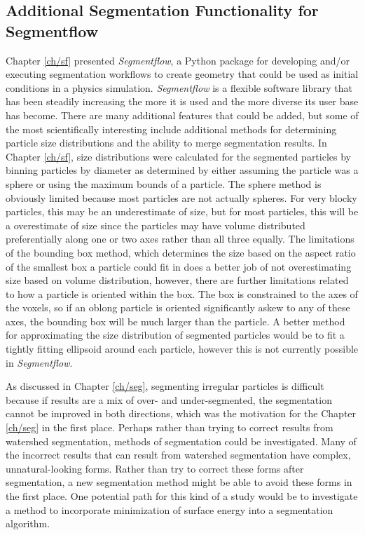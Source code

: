 \subsection{Additional Segmentation Functionality for Segmentflow}
Chapter \ref{ch/sf} presented \textit{Segmentflow}, a Python package for
developing and/or executing segmentation workflows to create geometry
that could be used as initial conditions in a physics simulation.
\textit{Segmentflow} is a flexible software library that has been steadily
increasing the more it is used and the more diverse its user base has
become. There are many additional features that could be added, but some of
the most scientifically interesting include additional methods for
determining particle size distributions and the ability to merge
segmentation results. In Chapter \ref{ch/sf}, size distributions were
calculated for the segmented particles by binning particles by diameter as
determined by either assuming the particle was a sphere or using the maximum
bounds of a particle. The sphere method is obviously limited because
most particles are not actually spheres. For very blocky
particles, this may be an underestimate of size, but for most particles,
this will be a overestimate of size since the particles may have volume
distributed preferentially along one or two axes rather than all three
equally. The limitations of the bounding box method, which determines the
size based on the aspect ratio of the smallest box a particle could fit in
does a better job of not overestimating size based on volume distribution,
however, there are further limitations related to how a particle is oriented
within the box. The box is constrained to the axes of the voxels, so if an
oblong particle is oriented significantly askew to any of these axes, the
bounding box will be much larger than the particle. A better method for
approximating the size distribution of segmented particles would be to fit
a tightly fitting ellipsoid around each particle, however this is not
currently possible in \textit{Segmentflow}.

As discussed in Chapter \ref{ch/seg}, segmenting irregular
particles is difficult because if results are a mix of over- and
under-segmented, the segmentation cannot be improved in both directions,
which was the motivation for the Chapter \ref{ch/seg} in the first place.
Perhaps rather than trying to correct results from watershed segmentation,
methods of segmentation could be investigated. Many of the
incorrect results that can result from watershed segmentation have complex,
unnatural-looking forms. Rather than try to correct these forms after
segmentation, a new segmentation method might be able to avoid these forms
in the first place. One potential path for
this kind of a study would be to investigate a method to
incorporate minimization of surface energy into a segmentation algorithm.

